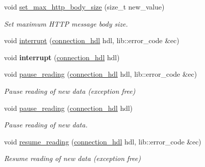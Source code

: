 \begin{DoxyCompactItemize}
void \mbox{\hyperlink{classwebsocketpp_1_1endpoint_a00be7e08ca5c567dd2a4989b8d41d26b}{set\+\_\+max\+\_\+http\+\_\+body\+\_\+size}} (size\+\_\+t new\+\_\+value)
\begin{DoxyCompactList}\small\item\em Set maximum H\+T\+TP message body size. \end{DoxyCompactList}\item 
void \mbox{\hyperlink{classwebsocketpp_1_1endpoint_ab6cd8d850c40f33f48d0afb4d7be094c}{interrupt}} (\mbox{\hyperlink{namespacewebsocketpp_a6b3d26a10ee7229b84b776786332631d}{connection\+\_\+hdl}} hdl, lib\+::error\+\_\+code \&ec)
\item 
\mbox{\label{classwebsocketpp_1_1endpoint_aa77facb47f09c143e5c22486f02bb455}} 
void {\bfseries interrupt} (\mbox{\hyperlink{namespacewebsocketpp_a6b3d26a10ee7229b84b776786332631d}{connection\+\_\+hdl}} hdl)
\item 
void \mbox{\hyperlink{classwebsocketpp_1_1endpoint_aef7666b82bf98864b213c3df09298595}{pause\+\_\+reading}} (\mbox{\hyperlink{namespacewebsocketpp_a6b3d26a10ee7229b84b776786332631d}{connection\+\_\+hdl}} hdl, lib\+::error\+\_\+code \&ec)
\begin{DoxyCompactList}\small\item\em Pause reading of new data (exception free) \end{DoxyCompactList}\item 
\mbox{\label{classwebsocketpp_1_1endpoint_af7ec27363d0fb1d657a264c4ad853b8e}} 
void \mbox{\hyperlink{classwebsocketpp_1_1endpoint_af7ec27363d0fb1d657a264c4ad853b8e}{pause\+\_\+reading}} (\mbox{\hyperlink{namespacewebsocketpp_a6b3d26a10ee7229b84b776786332631d}{connection\+\_\+hdl}} hdl)
\begin{DoxyCompactList}\small\item\em Pause reading of new data. \end{DoxyCompactList}\item 
void \mbox{\hyperlink{classwebsocketpp_1_1endpoint_a9753aaade09c9a7a0efd459861ba3b97}{resume\+\_\+reading}} (\mbox{\hyperlink{namespacewebsocketpp_a6b3d26a10ee7229b84b776786332631d}{connection\+\_\+hdl}} hdl, lib\+::error\+\_\+code \&ec)
\begin{DoxyCompactList}\small\item\em Resume reading of new data (exception free) \end{DoxyCompactList}\item 

\end{DoxyCompactItemize}
